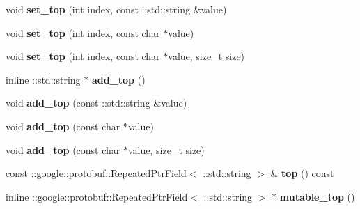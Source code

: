 \begin{DoxyCompactItemize}
\item 
\mbox{\label{classcaffe_1_1_v1_layer_parameter_adc651384464598f1a0d50a8b8e971084}} 
void {\bfseries set\+\_\+top} (int index, const \+::std\+::string \&value)
\item 
\mbox{\label{classcaffe_1_1_v1_layer_parameter_a8bfb494fadbfd4cc1f52372e107857bf}} 
void {\bfseries set\+\_\+top} (int index, const char $\ast$value)
\item 
\mbox{\label{classcaffe_1_1_v1_layer_parameter_a95e24ec2af4250c7217b0bacabde5082}} 
void {\bfseries set\+\_\+top} (int index, const char $\ast$value, size\+\_\+t size)
\item 
\mbox{\label{classcaffe_1_1_v1_layer_parameter_adc249cbb36076c327711481639230dc8}} 
inline \+::std\+::string $\ast$ {\bfseries add\+\_\+top} ()
\item 
\mbox{\label{classcaffe_1_1_v1_layer_parameter_ac16c94e579a083570daacddca60c74a3}} 
void {\bfseries add\+\_\+top} (const \+::std\+::string \&value)
\item 
\mbox{\label{classcaffe_1_1_v1_layer_parameter_a1a9ebe68629434dcd78c292c99b71638}} 
void {\bfseries add\+\_\+top} (const char $\ast$value)
\item 
\mbox{\label{classcaffe_1_1_v1_layer_parameter_aa2b3d19509d844e237989ae07636ef11}} 
void {\bfseries add\+\_\+top} (const char $\ast$value, size\+\_\+t size)
\item 
\mbox{\label{classcaffe_1_1_v1_layer_parameter_a3e772c8501a6d82262086f8ec34d4347}} 
const \+::google\+::protobuf\+::\+Repeated\+Ptr\+Field$<$ \+::std\+::string $>$ \& {\bfseries top} () const
\item 
\mbox{\label{classcaffe_1_1_v1_layer_parameter_ad019e44251f7c0da2a0663aae2fe8ccc}} 
inline \+::google\+::protobuf\+::\+Repeated\+Ptr\+Field$<$ \+::std\+::string $>$ $\ast$ {\bfseries mutable\+\_\+top} ()

\end{DoxyCompactItemize}
